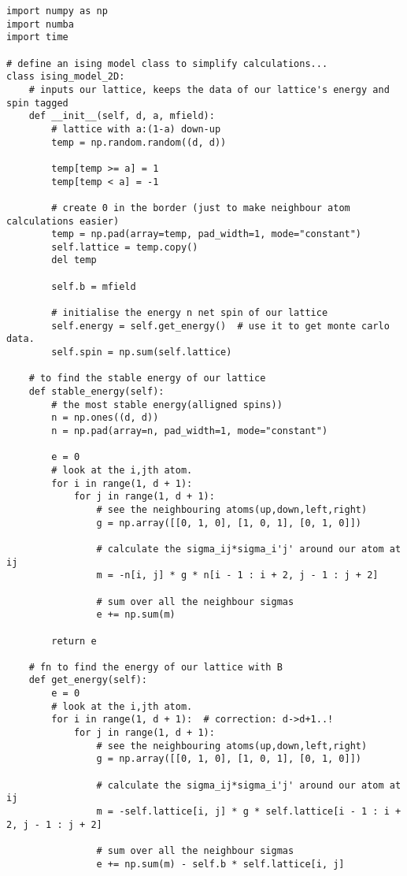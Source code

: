 \begin{verbatim}
import numpy as np
import numba
import time

# define an ising model class to simplify calculations...
class ising_model_2D:
    # inputs our lattice, keeps the data of our lattice's energy and spin tagged
    def __init__(self, d, a, mfield):
        # lattice with a:(1-a) down-up
        temp = np.random.random((d, d))

        temp[temp >= a] = 1
        temp[temp < a] = -1

        # create 0 in the border (just to make neighbour atom calculations easier)
        temp = np.pad(array=temp, pad_width=1, mode="constant")
        self.lattice = temp.copy()
        del temp

        self.b = mfield

        # initialise the energy n net spin of our lattice
        self.energy = self.get_energy()  # use it to get monte carlo data.
        self.spin = np.sum(self.lattice)

    # to find the stable energy of our lattice
    def stable_energy(self):
        # the most stable energy(alligned spins))
        n = np.ones((d, d))
        n = np.pad(array=n, pad_width=1, mode="constant")

        e = 0
        # look at the i,jth atom.
        for i in range(1, d + 1):
            for j in range(1, d + 1):
                # see the neighbouring atoms(up,down,left,right)
                g = np.array([[0, 1, 0], [1, 0, 1], [0, 1, 0]])

                # calculate the sigma_ij*sigma_i'j' around our atom at ij
                m = -n[i, j] * g * n[i - 1 : i + 2, j - 1 : j + 2]

                # sum over all the neighbour sigmas
                e += np.sum(m)

        return e

    # fn to find the energy of our lattice with B
    def get_energy(self):
        e = 0
        # look at the i,jth atom.
        for i in range(1, d + 1):  # correction: d->d+1..!
            for j in range(1, d + 1):
                # see the neighbouring atoms(up,down,left,right)
                g = np.array([[0, 1, 0], [1, 0, 1], [0, 1, 0]])

                # calculate the sigma_ij*sigma_i'j' around our atom at ij
                m = -self.lattice[i, j] * g * self.lattice[i - 1 : i + 2, j - 1 : j + 2]

                # sum over all the neighbour sigmas
                e += np.sum(m) - self.b * self.lattice[i, j]


\end{verbatim}
